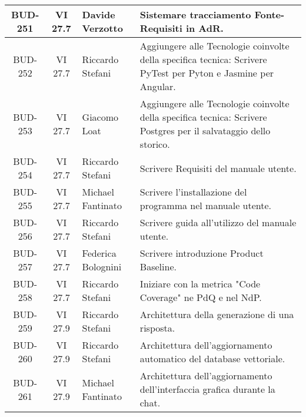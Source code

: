 \begin{table}[htbp]
\begin{tabular}{|c|c|p{}|p{}|}
    \hline
    BUD-251 & VI 27.7 & Davide Verzotto &  Sistemare tracciamento Fonte-Requisiti in AdR.\\
    \hline
    BUD-252 & VI 27.7 & Riccardo Stefani & Aggiungere alle Tecnologie coinvolte della specifica tecnica: Scrivere PyTest per Pyton e Jasmine per Angular. \\
    \hline
    BUD-253 & VI 27.7 & Giacomo Loat & Aggiungere alle Tecnologie coinvolte della specifica tecnica: Scrivere Postgres per il salvataggio dello storico. \\
    \hline
    BUD-254 & VI 27.7 & Riccardo Stefani & Scrivere Requisiti del manuale utente. \\
    \hline
    BUD-255 & VI 27.7 & Michael Fantinato & Scrivere l'installazione del programma nel manuale utente. \\
    \hline
    BUD-256 & VI 27.7 & Riccardo Stefani & Scrivere guida all'utilizzo del manuale utente.\\
    \hline
    BUD-257 & VI 27.7 & Federica Bolognini & Scrivere introduzione Product Baseline. \\
    \hline
    BUD-258 & VI 27.7 & Riccardo Stefani & Iniziare con la metrica "Code Coverage" ne PdQ e nel NdP. \\
    \hline
    BUD-259 & VI 27.9 & Riccardo Stefani & Architettura della generazione di una risposta. \\
    \hline
    BUD-260 & VI 27.9 & Riccardo Stefani & Architettura dell'aggiornamento automatico del database vettoriale. \\
    \hline
    BUD-261 & VI 27.9 & Michael Fantinato & Architettura dell'aggiornamento dell'interfaccia grafica durante la chat. \\
    \hline
\end{tabular}
\end{table}

